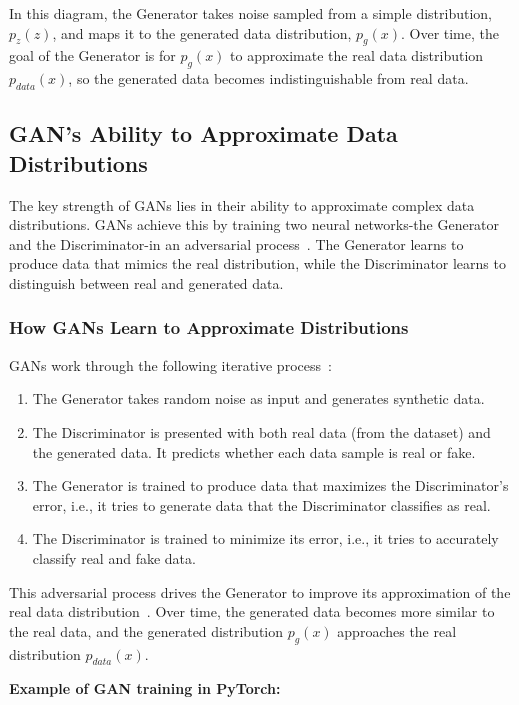 In this diagram, the Generator takes noise sampled from a simple distribution, \( p_z(z) \), and maps it to the generated data distribution, \( p_g(x) \). Over time, the goal of the Generator is for \( p_g(x) \) to approximate the real data distribution \( p_{data}(x) \), so the generated data becomes indistinguishable from real data.

\subsection{GAN's Ability to Approximate Data Distributions}
The key strength of GANs lies in their ability to approximate complex data distributions. GANs achieve this by training two neural networks-the Generator and the Discriminator-in an adversarial process~\cite{he2018probgan, farnia2020gans}. The Generator learns to produce data that mimics the real distribution, while the Discriminator learns to distinguish between real and generated data.

\subsubsection{How GANs Learn to Approximate Distributions}
GANs work through the following iterative process~\cite{goodfellow2014generative, he2018probgan, kazeminia2020gans}:

\begin{enumerate}
    \item The Generator takes random noise as input and generates synthetic data.
    \item The Discriminator is presented with both real data (from the dataset) and the generated data. It predicts whether each data sample is real or fake.
    \item The Generator is trained to produce data that maximizes the Discriminator's error, i.e., it tries to generate data that the Discriminator classifies as real.
    \item The Discriminator is trained to minimize its error, i.e., it tries to accurately classify real and fake data.
\end{enumerate}

This adversarial process drives the Generator to improve its approximation of the real data distribution~\cite{aggarwal2021generative}. Over time, the generated data becomes more similar to the real data, and the generated distribution \( p_g(x) \) approaches the real distribution \( p_{data}(x) \).

\textbf{Example of GAN training in PyTorch:}

